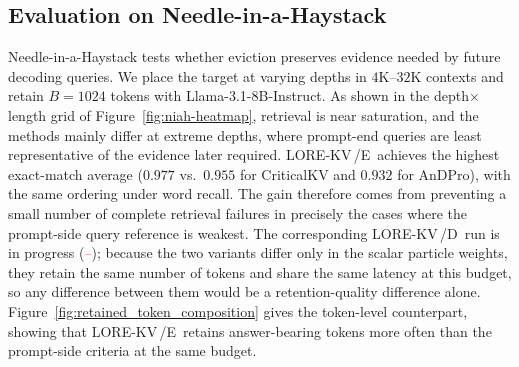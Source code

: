 \documentclass{article} %
\newcommand{\tbd}{\textcolor{red}{--}}
\newcommand{\lorekvE}{LORE-KV\,/E}
\newcommand{\lorekvD}{LORE-KV\,/D}
\begin{document}
\subsection{Evaluation on Needle-in-a-Haystack}\label{subsec:niah}
Needle-in-a-Haystack tests whether eviction preserves evidence needed by future decoding queries. We place the target at varying depths in $4$K--$32$K contexts and retain $B=1024$ tokens with Llama-3.1-8B-Instruct. As shown in the depth$\times$length grid of Figure~\ref{fig:niah-heatmap}, retrieval is near saturation, and the methods mainly differ at extreme depths, where prompt-end queries are least representative of the evidence later required. \lorekvE\ achieves the highest exact-match average ($0.977$ vs.\ $0.955$ for CriticalKV and $0.932$ for AnDPro), with the same ordering under word recall. The gain therefore comes from preventing a small number of complete retrieval failures in precisely the cases where the prompt-side query reference is weakest. The corresponding \lorekvD\ run is in progress (\tbd); because the two variants differ only in the scalar particle weights, they retain the same number of tokens and share the same latency at this budget, so any difference between them would be a retention-quality difference alone. Figure~\ref{fig:retained_token_composition} gives the token-level counterpart, showing that \lorekvE\ retains answer-bearing tokens more often than the prompt-side criteria at the same budget.
\end{document}
